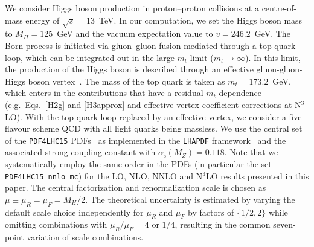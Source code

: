 \documentclass[12pt]{article}
\DeclareRobustCommand{\as}{\ensuremath{\alpha_{\mathrm{s}}}}
\begin{document}
We consider Higgs boson production in proton--proton collisions at a centre-of-mass energy of $\sqrt{s}=13$~TeV. In our computation, we set the Higgs boson mass to $M_H= 125$~GeV and the vacuum expectation value to $v=246.2$~GeV. 
The Born process is initiated via gluon--gluon fusion mediated through a top-quark loop, which can be integrated out in the large-$m_t$ limit ($m_{t}\rightarrow \infty$).
In this limit, the production of the Higgs boson is described through an effective gluon-gluon-Higgs boson vertex~\cite{Heft}.
The mass of the top quark is taken as $m_t = 173.2$~GeV, which enters in the contributions that have a residual $m_t$ dependence (e.g.\ Eqs.~\eqref{H2g} and \eqref{H3approx} and effective vertex coefficient corrections at N$^3$LO). 
With the top quark loop replaced by an effective vertex, we consider a five-flavour scheme QCD with all light quarks being massless. We use the central set of the \verb|PDF4LHC15| PDFs~\cite{nnpdf} as implemented in the \texttt{LHAPDF} framework~\cite{Buckley:2014ana} and the associated strong coupling constant with $\as(M_Z)=0.118$. Note that we systematically employ the same order in the PDFs (in particular the set \verb|PDF4LHC15_nnlo_mc|) for the LO, NLO, NNLO and N$^{3}$LO results presented in this paper. The central factorization and renormalization scale is chosen as $\mu \equiv \mu_R = \mu_F =  M_H / 2$. The theoretical uncertainty is estimated by varying the default scale choice independently for $\mu_R$ and $\mu_F$ by factors of $\{1/2,2\}$ while omitting combinations with $\mu_R/\mu_F = 4$ or $1/4$, resulting in the common seven-point variation of scale combinations. 
\end{document}
